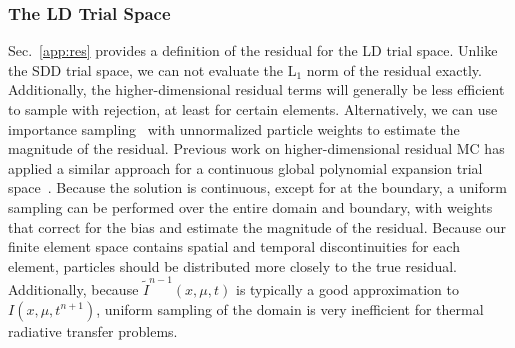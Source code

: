 \documentclass{anstrans}
\begin{document}
\subsubsection{The LD Trial Space}

Sec.~\ref{app:res} provides a definition of the residual for the LD trial space.
Unlike the SDD trial space, we can not evaluate the L$_1$ norm of the residual exactly.
Additionally, the higher-dimensional residual terms will generally be less efficient to sample with rejection, at
least for certain elements.  Alternatively, we can use importance sampling~\cite{shultis_mc} with
unnormalized particle weights to estimate the magnitude of the
residual.
Previous work on higher-dimensional residual MC has  applied a similar approach for a continuous
global polynomial expansion trial space~\cite{favorite_ecmc}.  Because the solution is continuous, except for at the
boundary, a uniform sampling can be performed over the entire domain and boundary, with weights that
correct for the bias and estimate the magnitude of the residual.  Because our finite element space
contains spatial and temporal discontinuities for each element, particles should be distributed more
closely to the true residual.  Additionally, because $\tilde I^{n-1}(x,\mu,t)$ is typically a good
approximation to $I(x,\mu,t^{n+1})$, uniform sampling of the domain is very inefficient for thermal
radiative transfer problems.
\end{document}
